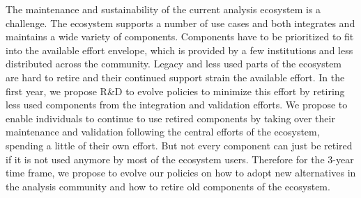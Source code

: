 \documentclass[12pt,a4paper]{article}
\begin{document}
The maintenance and sustainability of the current analysis ecosystem is a challenge. The ecosystem supports a number of use cases and both integrates and maintains a wide variety of components. Components have to be prioritized to fit into the available effort envelope, which is provided by a few institutions and less distributed across the community. Legacy and less used parts of the ecosystem are hard to retire and their continued support strain the available effort. In the first year, we propose R\&D to evolve policies to minimize this effort by retiring less used components from the integration and validation efforts. We propose to enable individuals to continue to use retired components by taking over their maintenance and validation following the central efforts of the ecosystem, spending a little of their own effort. 
But not every component can just be retired if it is not used anymore by most of the ecosystem users. Therefore for the 3-year time frame, we propose to evolve our policies on how to adopt new alternatives in the analysis community and how to retire old components of the ecosystem.
\end{document}
